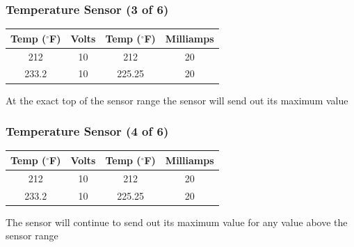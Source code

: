 \begin{frame}
    \frametitle{Temperature Sensor (3 of 6)}

    \begin{table}
        \centering
        \begin{tabular}{|c|c|c|c|}
            \hline
            Temp ($^\circ$F) & Volts & Temp ($^\circ$F) & Milliamps\\
             \hline
             212 & 10 & 212 & 20\\
             \hline
             \hline
             233.2 & 10 & 225.25 & 20\\
             \hline
        \end{tabular}
    \end{table}

    \vspace{1em}
    \centering
    {\footnotesize At the exact top of the sensor range the sensor will send out its maximum value\par}
\end{frame}

\begin{frame}
    \frametitle{Temperature Sensor (4 of 6)}

    \begin{table}
        \centering
        \begin{tabular}{|c|c|c|c|}
            \hline
            Temp ($^\circ$F) & Volts & Temp ($^\circ$F) & Milliamps\\
             \hline
             212 & 10 & 212 & 20\\
             \hline
             \hline
             233.2 & 10 & 225.25 & 20\\
             \hline
        \end{tabular}
    \end{table}

    \vspace{1em}
    \centering
    {\footnotesize The sensor will continue to send out its maximum value for any value above the sensor range\par}
\end{frame}

